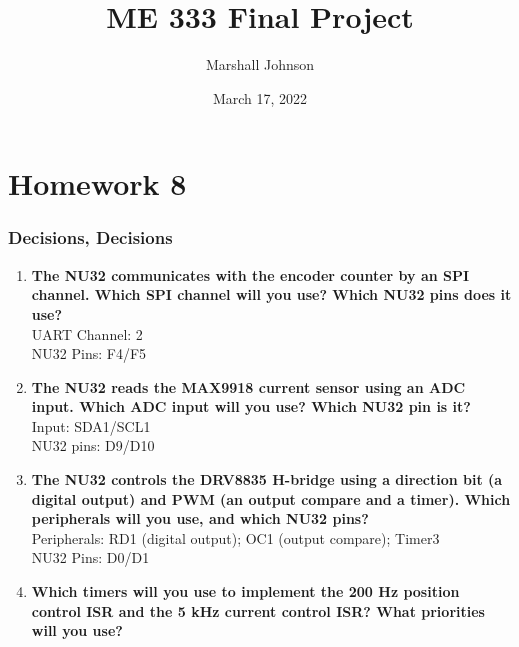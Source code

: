 \documentclass{article}
\title{ME 333 Final Project}
\author{Marshall Johnson}
\date{March 17, 2022}
\begin{document}
\maketitle

\section*{Homework 8}

\setcounter{section}{28}
\setcounter{subsection}{4}
\setcounter{subsubsection}{0}
\subsubsection{Decisions, Decisions}
\begin{enumerate}[label=\textbf{\arabic*})]
    \item \textbf{The NU32 communicates with the encoder counter by an SPI channel. Which SPI channel
    will you use? Which NU32 pins does it use?} \\

    UART Channel: 2 \\

    NU32 Pins: F4/F5 \\

    \item \textbf{The NU32 reads the MAX9918 current sensor using an ADC input. Which ADC input
    will you use? Which NU32 pin is it?} \\

    Input: SDA1/SCL1 \\

    NU32 pins: D9/D10 \\

    \item \textbf{The NU32 controls the DRV8835 H-bridge using a direction bit (a digital output) and
    PWM (an output compare and a timer). Which peripherals will you use, and which NU32
    pins?} \\

    Peripherals: RD1 (digital output); OC1 (output compare); Timer3 \\

    NU32 Pins: D0/D1 \\

    \item \textbf{Which timers will you use to implement the 200 Hz position control ISR and the 5 kHz
    current control ISR? What priorities will you use?} \\


\end{enumerate}
\end{document}
